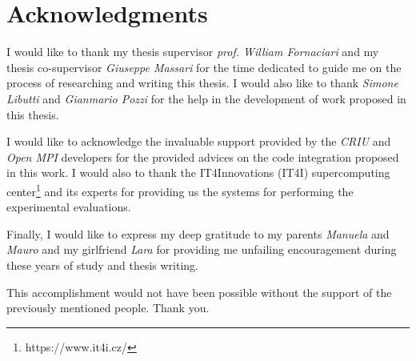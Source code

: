 \chapter*{Acknowledgments}
I would like to thank my thesis supervisor \emph{prof. William Fornaciari} and
my thesis co-supervisor \emph{Giuseppe Massari} for the time dedicated to
guide me on the process of researching and writing this thesis. I would also
like to thank \emph{Simone Libutti} and \emph{Gianmario Pozzi} for the help in
the development of work proposed in this thesis.

\vspace{0.5cm}

I would like to acknowledge the invaluable support provided by the \emph{CRIU}
and \emph{Open MPI} developers for the provided advices on the code
integration proposed in this work. I would also to thank the IT4Innovations
(IT4I) supercomputing center\footnote{https://www.it4i.cz/} and its experts for
providing us the systems for performing the experimental evaluations.

\vspace{0.5cm}

Finally, I would like to express my deep gratitude to my parents \emph{Manuela}
and \emph{Mauro} and my girlfriend \emph{Lara} for providing me unfailing
encouragement during these years of study and thesis writing.

\vspace{0.5cm}

This accomplishment would not have been possible without the support of the
previously mentioned people. Thank you.